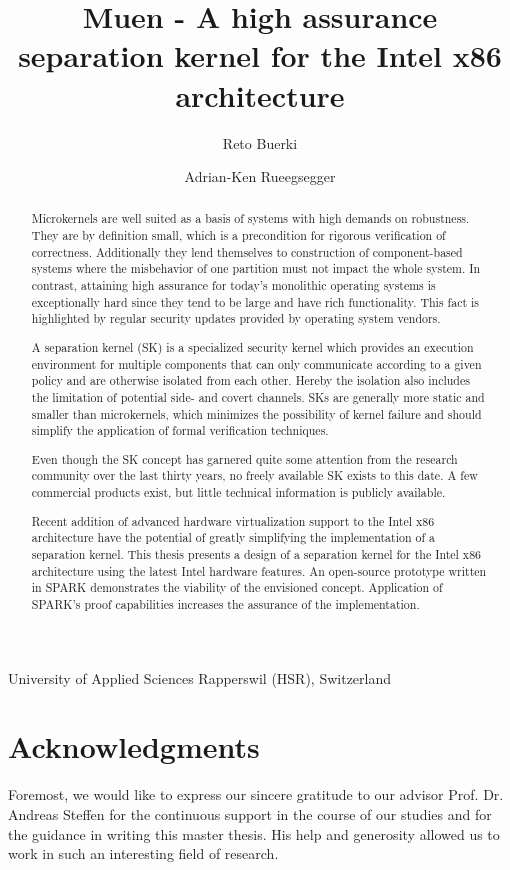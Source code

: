 \documentclass[a4paper,twoside]{report}
\title{Muen - A high assurance separation kernel for the Intel x86 architecture}
\author{Reto Buerki \and Adrian-Ken Rueegsegger}
\begin{document}


\maketitle

University of Applied Sciences Rapperswil (HSR), Switzerland

\begin{abstract}
Microkernels are well suited as a basis of systems with high demands on
robustness. They are by definition small, which is a precondition for rigorous
verification of correctness. Additionally they lend themselves to construction
of component-based systems where the misbehavior of one partition must not
impact the whole system. In contrast, attaining high assurance for today's
monolithic operating systems is exceptionally hard since they tend to be large
and have rich functionality. This fact is highlighted by regular security
updates provided by operating system vendors.

A separation kernel (SK) is a specialized security kernel which provides an
execution environment for multiple components that can only communicate
according to a given policy and are otherwise isolated from each other. Hereby
the isolation also includes the limitation of potential side- and covert
channels. SKs are generally more static and smaller than microkernels, which
minimizes the possibility of kernel failure and should simplify the application
of formal verification techniques.

Even though the SK concept has garnered quite some attention from the research
community over the last thirty years, no freely available SK exists to this
date. A few commercial products exist, but little technical information is
publicly available.

Recent addition of advanced hardware virtualization support to the Intel x86
architecture have the potential of greatly simplifying the implementation of a
separation kernel. This thesis presents a design of a separation kernel for the
Intel x86 architecture using the latest Intel hardware features. An open-source
prototype written in SPARK demonstrates the viability of the envisioned
concept.  Application of SPARK's proof capabilities increases the assurance of
the implementation.
\end{abstract}

\section*{Acknowledgments}
Foremost, we would like to express our sincere gratitude to our advisor Prof.
Dr. Andreas Steffen for the continuous support in the course of our studies and
for the guidance in writing this master thesis. His help and generosity allowed
us to work in such an interesting field of research.
\end{document}
